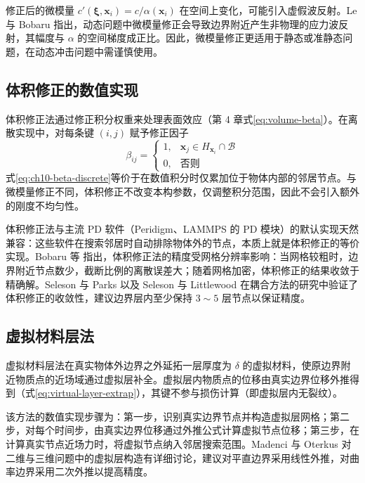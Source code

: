 修正后的微模量 $c'(\boldsymbol{\xi},\mathbf{x}_{i})=c/\alpha(\mathbf{x}_{i})$ 在空间上变化，可能引入虚假波反射。Le 与 Bobaru \cite{LeBobaru2018} 指出，动态问题中微模量修正会导致边界附近产生非物理的应力波反射，其幅度与 $\alpha$ 的空间梯度成正比。因此，微模量修正更适用于静态或准静态问题，在动态冲击问题中需谨慎使用。

\subsection{体积修正的数值实现}

体积修正法通过修正积分权重来处理表面效应（第 4 章式\eqref{eq:volume-beta}）。在离散实现中，对每条键 $(i,j)$ 赋予修正因子
\begin{equation}
\beta_{ij} =
\begin{cases}
1, & \mathbf{x}_{j}\in H_{\mathbf{x}_{i}}\cap\mathcal{B}\\
0, & \text{否则}
\end{cases}
\label{eq:ch10-beta-discrete}
\end{equation}
式\eqref{eq:ch10-beta-discrete}等价于在数值积分时仅累加位于物体内部的邻居节点。与微模量修正不同，体积修正不改变本构参数，仅调整积分范围，因此不会引入额外的刚度不均匀性。

体积修正法与主流 PD 软件（Peridigm、LAMMPS 的 PD 模块）的默认实现天然兼容：这些软件在搜索邻居时自动排除物体外的节点，本质上就是体积修正的等价实现。Bobaru 等 \cite{Bobaru2016} 指出，体积修正法的精度受网格分辨率影响：当网格较粗时，边界附近节点数少，截断比例的离散误差大；随着网格加密，体积修正的结果收敛于精确解。Seleson 与 Parks \cite{SelesonParks2011} 以及 Seleson 与 Littlewood \cite{SelesonLittlewood2016} 在耦合方法的研究中验证了体积修正的收敛性，建议边界层内至少保持 $3\sim 5$ 层节点以保证精度。

\subsection{虚拟材料层法}

虚拟材料层法在真实物体外边界之外延拓一层厚度为 $\delta$ 的虚拟材料，使原边界附近物质点的近场域通过虚拟层补全。虚拟层内物质点的位移由真实边界位移外推得到（式\eqref{eq:virtual-layer-extrap}），其键不参与损伤计算（即虚拟层内无裂纹）。

该方法的数值实现步骤为：第一步，识别真实边界节点并构造虚拟层网格；第二步，对每个时间步，由真实边界位移通过外推公式计算虚拟节点位移；第三步，在计算真实节点近场力时，将虚拟节点纳入邻居搜索范围。Madenci 与 Oterkus \cite{MadenciOterkus2014} 对二维与三维问题中的虚拟层构造有详细讨论，建议对平直边界采用线性外推，对曲率边界采用二次外推以提高精度。

